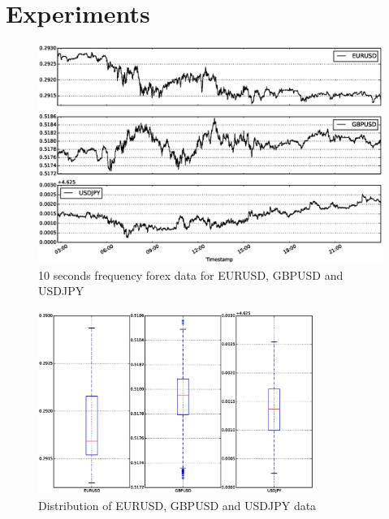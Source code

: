 \section{Experiments}

\begin{figure}[!h]
  \centering
  \includegraphics[width=\textwidth]{img/forexdata}
  \caption{10 seconds frequency forex data for EURUSD, GBPUSD and USDJPY}
  \label{fig:forexdata}
\end{figure}

\begin{figure}[!h]
  \centering
  \includegraphics[width=0.8\textwidth]{img/distdata}
  \caption{Distribution of EURUSD, GBPUSD and USDJPY data}
  \label{fig:distdata}
\end{figure}


